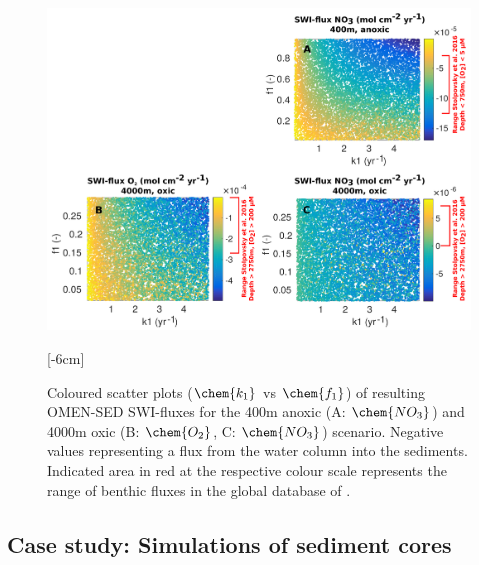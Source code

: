 \documentclass[gmd, manuscript]{copernicus}
\begin{document}
\begin{figure}[htbp]
\begin{center}
	\includegraphics[width=1.0\textwidth]{figures/SA/k1_vs_f1_SWIflux_COMBINED_1604.pdf}
	\caption{Coloured scatter plots ($\chem{k_1}$ vs $\chem{f_1}$) of resulting OMEN-SED SWI-fluxes for the 400m anoxic (A: $\chem{NO_3}$) and 4000m oxic (B: $\chem{O_2}$, C: $\chem{NO_3}$) scenario. 
	Negative values representing a flux from the water column into the sediments.
	Indicated area in red at the respective colour scale represents the range of benthic fluxes in the global database of \citet{bohlen_simple_2012}. 
}\label{fig:SA_Color_ScatterPlots}
[-6cm]%
\end{center}
\end{figure}


\subsection{Case study: Simulations of sediment cores}\label{subsec:SedProfiles}
\end{document}
